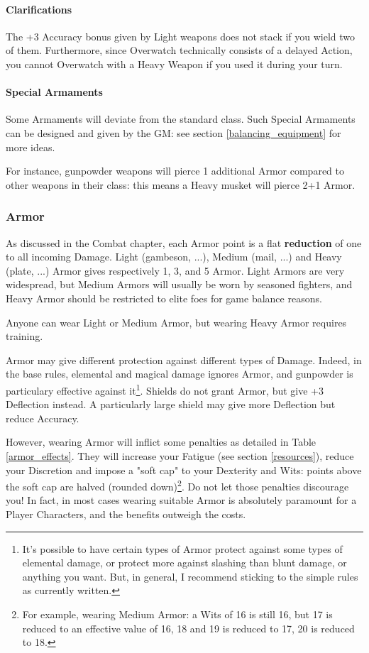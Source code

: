 \paragraph{Clarifications}

The +3 Accuracy bonus given by Light weapons does not stack if you wield two of them. Furthermore, since Overwatch technically consists of a delayed Action, you cannot Overwatch with a Heavy Weapon if you used it during your turn.

\paragraph{Special Armaments}

Some Armaments will deviate from the standard class. Such Special Armaments can be designed and given by the GM: see section \ref{balancing_equipment} for more ideas.

For instance, gunpowder weapons will pierce 1 additional Armor compared to other weapons in their class: this means a Heavy musket will pierce 2+1 Armor.

\subsubsection{Armor}

\label{armor}

As discussed in the Combat chapter, each Armor point is a flat \textbf{reduction} of one to all incoming Damage. Light (gambeson, ...), Medium (mail, ...) and Heavy (plate, ...) Armor gives respectively 1, 3, and 5 Armor. Light Armors are very widespread, but Medium Armors will usually be worn by seasoned fighters, and Heavy Armor should be restricted to elite foes for game balance reasons.

Anyone can wear Light or Medium Armor, but wearing Heavy Armor requires training.

Armor may give different protection against different types of Damage. Indeed, in the base rules, elemental and magical damage ignores Armor, and gunpowder is particulary effective against it\footnote{It's possible to have certain types of Armor protect against some types of elemental damage, or protect more against slashing than blunt damage, or anything you want. But, in general, I recommend sticking to the simple rules as currently written.}. Shields do not grant Armor, but give +3 Deflection instead. A particularly large shield may give more Deflection but reduce Accuracy.

However, wearing Armor will inflict some penalties as detailed in Table \ref{armor_effects}. They will increase your Fatigue (see section \ref{resources}), reduce your Discretion and impose a "soft cap" to your Dexterity and Wits: points above the soft cap are halved (rounded down)\footnote{For example, wearing Medium Armor: a Wits of 16 is still 16, but 17 is reduced to an effective value of 16, 18 and 19 is reduced to 17, 20 is reduced to 18.}. Do not let those penalties discourage you! In fact, in most cases wearing suitable Armor is absolutely paramount for a Player Characters, and the benefits outweigh the costs.


